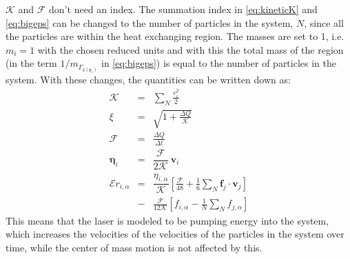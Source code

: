 \documentclass[12pt]{article}
\begin{document}
$\mathcal{K}$ and $\mathcal{F}$ don't need an index. The summation index in \eqref{eq:kineticK} and \eqref{eq:bigeps} can be changed to the number of
particles in the system, $N$, since all the particles are within the heat exchanging region. The masses are set to 1, i.e. $m_i = 1$ with the chosen
reduced units and with this the total mass of the region (in the term $1/m_{\Gamma_{k(\mathbf{r}_i)}}$ in \eqref{eq:bigeps}) is equal to the number of
particles in the system. With these changes, the quantities can be written down as:
\begin{eqnarray}
    \mathcal{K} &=& \sum_{N} \frac{v_i^2}{2}\\
    \xi &=& \sqrt{1+\frac{\Delta Q}{\mathcal{K}}}\\
    \mathcal{F} &=& \frac{\Delta Q}{\Delta t}\\
    \boldsymbol{\eta}_i &=& 
    \dfrac{\mathcal{F}}{{2\mathcal{K}}} \
        \mathbf{v}_i\\
        \mathcal{E}{r}_{i,\alpha} &=& \dfrac{\eta_{i,\alpha}}{\mathcal{K}} \left[
        \frac{\mathcal{F}}{48} + \frac{1}{6} \sum_{N} \mathbf{f}_j \cdot \mathbf{v}_j
            \right] \nonumber \\
            &-& \frac{\mathcal{F}}{12\mathcal{K}} \left[
            {f_{i,\alpha}} - \frac{1}{N} \sum_{N}f_{j,\alpha}\right]
\end{eqnarray}
This means that the laser is modeled to be pumping energy into the system, which increases the velocities of the velocities of the particles in the
system over time, while the center of mass motion is not affected by this.\\
\end{document}
